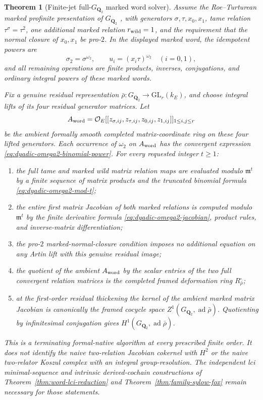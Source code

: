 \documentclass[11pt]{article}
\newtheorem{theorem}{Theorem}[section]
\theoremstyle{definition}
\begin{document}
\begin{theorem}[Finite-jet full-$G_{\mathbf Q_2}$ marked word solver]
\label{thm:dyadic-q2-marked-word-jet-solver}
Assume the Roe--Turturean marked
profinite presentation of $G_{\mathbf Q_2}$
\cite{RoeTurtureanGQ2}, with generators
$\sigma,\tau,x_0,x_1$, tame relation
$\tau^\sigma=\tau^2$, one additional
marked relation $r_{\rm wild}=1$,
and the requirement that the normal
closure of $x_0,x_1$ be pro-$2$.
In the displayed marked word,
the idempotent powers are
\[
 \sigma_2=\sigma^{\omega_2},
 \qquad
 u_i=(x_i\tau)^{\omega_2}\quad(i=0,1),
\]
and all remaining operations are
finite products, inverses, conjugations,
and ordinary integral powers of
these marked words.

Fix a genuine residual representation
$\bar\rho:G_{\mathbf Q_2}\to\mathrm{GL}_r(k_E)$,
and choose integral lifts of its four
residual generator matrices.
Let
\[
 A_{\rm word}
 =\mathcal O_E[[z_{\sigma,ij},z_{\tau,ij},
                z_{0,ij},z_{1,ij}]]_{1\le i,j\le r}
\]
be the \emph{ambient} formally smooth
completed matrix-coordinate ring on
these four lifted generators.
Each occurrence of $\omega_2$ on
$A_{\rm word}$ has the
convergent expression
\eqref{eq:dyadic-omega2-binomial-power}.
For every requested integer $t\ge1$:
\begin{enumerate}[label=\textnormal{(\roman*)}]
\item the full tame and marked wild
matrix relation maps are evaluated
modulo $\mathfrak m^t$ by a finite
sequence of matrix products and
the truncated binomial formula
\eqref{eq:dyadic-omega2-mod-t};
\item the entire first matrix Jacobian
of both marked relations is computed
modulo $\mathfrak m^t$ by the
finite derivative formula
\eqref{eq:dyadic-omega2-jacobian},
product rules, and inverse-matrix
differentiation;
\item the pro-$2$ marked-normal-closure
condition imposes no additional
equation on any Artin lift with
this genuine residual image;
\item the quotient of the ambient
$A_{\rm word}$ by the scalar entries
of the two full convergent relation
matrices is the completed framed
deformation ring $R_{\bar\rho}^{\square}$;
\item at the first-order residual
thickening the kernel of the
\emph{ambient} marked matrix
Jacobian is canonically the framed
cocycle space $Z^1(G_{\mathbf Q_2},
\operatorname{ad}\bar\rho)$.
Quotienting by infinitesimal
conjugation gives
$H^1(G_{\mathbf Q_2},
\operatorname{ad}\bar\rho)$.
\end{enumerate}
This is a \emph{terminating
formal-native algorithm} at every
prescribed finite order.  It does
not identify the naive two-relation
Jacobian cokernel with $H^2$ or
the naive two-relator Koszul complex
with an integral group-resolution.
The independent lci minimal-sequence
and intrinsic derived-cochain
constructions of
Theorem~\ref{thm:word-lci-reduction}
and Theorem~\ref{thm:family-sylow-fox}
remain necessary for those statements.
\end{theorem}
\end{document}
